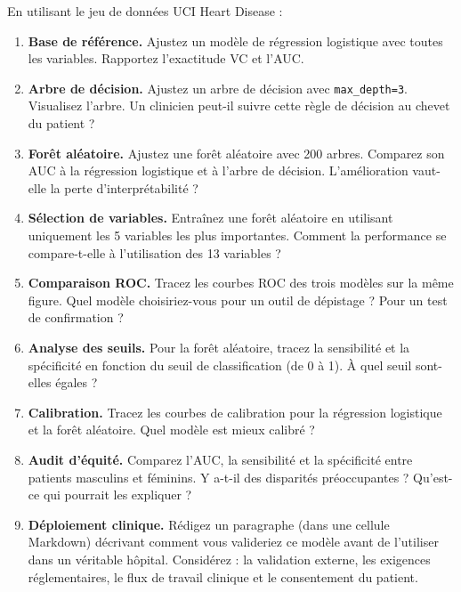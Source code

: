 \begin{exercise}
En utilisant le jeu de donn\'ees UCI Heart Disease :
\begin{enumerate}
  \item \textbf{Base de r\'ef\'erence.} Ajustez un mod\`ele de r\'egression logistique avec toutes les variables. Rapportez l'exactitude VC et l'AUC.
  \item \textbf{Arbre de d\'ecision.} Ajustez un arbre de d\'ecision avec \texttt{max\_depth=3}. Visualisez l'arbre. Un clinicien peut-il suivre cette r\`egle de d\'ecision au chevet du patient ?
  \item \textbf{For\^et al\'eatoire.} Ajustez une for\^et al\'eatoire avec 200 arbres. Comparez son AUC \`a la r\'egression logistique et \`a l'arbre de d\'ecision. L'am\'elioration vaut-elle la perte d'interpr\'etabilit\'e ?
  \item \textbf{S\'election de variables.} Entra\^inez une for\^et al\'eatoire en utilisant uniquement les 5 variables les plus importantes. Comment la performance se compare-t-elle \`a l'utilisation des 13 variables ?
  \item \textbf{Comparaison ROC.} Tracez les courbes ROC des trois mod\`eles sur la m\^eme figure. Quel mod\`ele choisiriez-vous pour un outil de d\'epistage ? Pour un test de confirmation ?
  \item \textbf{Analyse des seuils.} Pour la for\^et al\'eatoire, tracez la sensibilit\'e et la sp\'ecificit\'e en fonction du seuil de classification (de 0 \`a 1). \`A quel seuil sont-elles \'egales ?
  \item \textbf{Calibration.} Tracez les courbes de calibration pour la r\'egression logistique et la for\^et al\'eatoire. Quel mod\`ele est mieux calibr\'e ?
  \item \textbf{Audit d'\'equit\'e.} Comparez l'AUC, la sensibilit\'e et la sp\'ecificit\'e entre patients masculins et f\'eminins. Y a-t-il des disparit\'es pr\'eoccupantes ? Qu'est-ce qui pourrait les expliquer ?
  \item \textbf{D\'eploiement clinique.} R\'edigez un paragraphe (dans une cellule Markdown) d\'ecrivant comment vous valideriez ce mod\`ele avant de l'utiliser dans un v\'eritable h\^opital. Consid\'erez : la validation externe, les exigences r\'eglementaires, le flux de travail clinique et le consentement du patient.
\end{enumerate}
\end{exercise}


